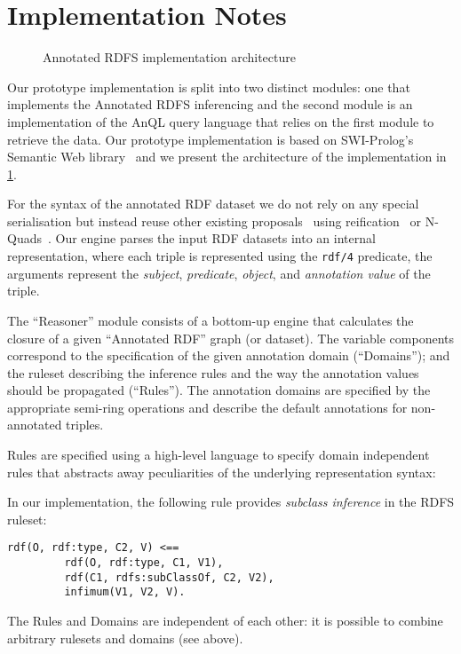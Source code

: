\section{Implementation Notes}
\label{sec:implementation-notes}

\begin{figure}[t]
  \centering
  
  \caption{Annotated RDFS implementation architecture}
  \label{fig:aRDF-schema}
\end{figure}

Our prototype implementation is split into two distinct modules: one that implements the Annotated RDFS inferencing
and the second module is an implementation of the AnQL query language that relies on the first module to retrieve
the data.  Our prototype implementation is based on SWI-Prolog's Semantic Web
library~\cite{WielemakerHuangvan-der-Meij:2008aa} and we present the architecture of the implementation in
\cref{fig:aRDF-schema}.


For the syntax of the annotated \ac{RDF} dataset we do not rely on any special serialisation but instead reuse other
existing proposals \eg~using reification~\cite{GutierrezHurtadoVaisman:2007aa} or
N-Quads~\cite{CyganiakHarthHogan:2009aa}.  Our engine parses the input \ac{RDF} datasets into an internal
representation, where each triple is represented using the \verb+rdf/4+ predicate, the arguments represent the
\emph{subject}, \emph{predicate}, \emph{object}, and \emph{annotation value} of the triple.


The ``Reasoner'' module consists of a bottom-up engine that calculates the closure of a given ``Annotated RDF'' graph
(or dataset).
%
The variable components correspond to the specification of the given annotation domain (``Domains''); and the ruleset
describing the inference rules and the way the annotation values should be propagated (``Rules'').  
%
The annotation domains are specified by the appropriate semi-ring operations and describe the default annotations for
non-annotated triples.

Rules are specified using a high-level language to specify domain independent rules that abstracts away peculiarities of
the underlying representation syntax:
%
\begin{example}
  In our implementation, the following rule provides \textit{subclass inference} in the \ac{RDFS} ruleset:
%
\begin{Verbatim}[fontsize=\small]
rdf(O, rdf:type, C2, V) <==
         rdf(O, rdf:type, C1, V1),
         rdf(C1, rdfs:subClassOf, C2, V2),
         infimum(V1, V2, V).
\end{Verbatim}
%
\end{example}
%
The Rules and Domains are independent of each other: it is possible to combine arbitrary rulesets and domains (see
above).


